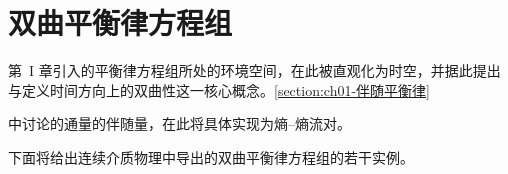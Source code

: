 \documentclass[../main.tex]{subfiles}
\begin{document}
\chapter{双曲平衡律方程组}\label{chapter:ch03-双曲平衡律方程组}

第~I 章引入的平衡律方程组所处的环境空间，在此被直观化为时空，并据此提出与定义时间方向上的双曲性这一核心概念。\cref{section:ch01-伴随平衡律}%

中讨论的通量的伴随量，在此将具体实现为熵--熵流对。

下面将给出连续介质物理中导出的双曲平衡律方程组的若干实例。








\end{document}

